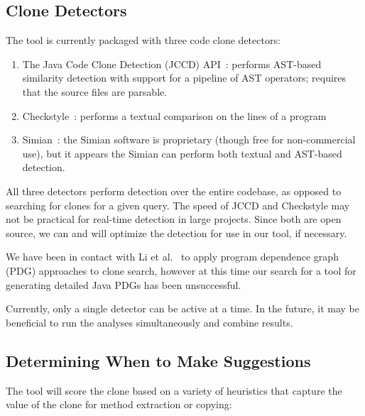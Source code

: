 \documentclass[preprint,10pt]{sigplanconf}
\begin{document}
\subsection{Clone Detectors}
\label{sec:detectors}
The tool is currently packaged with three code clone detectors:

\begin{enumerate}
\item The Java Code Clone Detection (JCCD) API~\cite{JCCD}: performs
  AST-based similarity detection with support for a pipeline of AST
  operators; requires that the source files are parsable.
\item Checkstyle~\cite{CheckStyle}: performs a textual comparison on
  the lines of a program
\item Simian~\cite{Simian}: the Simian software is proprietary (though
  free for non-commercial use), but it appears the Simian can perform
  both textual and AST-based detection.
\end{enumerate}

All three detectors perform detection over the entire codebase, as
opposed to searching for clones for a given query. The speed of JCCD
and Checkstyle may not be practical for real-time detection in large
projects. Since both are open source, we can and will optimize the
detection for use in our tool, if necessary.  


We have been in contact with Li et al.~\cite{LiE2011} to apply program
dependence graph (PDG) approaches to clone search, however at this
time our search for a tool for generating detailed Java PDGs has been
unsuccessful.

Currently, only a single detector can be active at a time. In the
future, it may be beneficial to run the analyses simultaneously and
combine results.

\subsection{Determining When to Make Suggestions}
The tool will score the clone based on a variety of heuristics that
capture the value of the clone for method extraction or copying:
\end{document}
